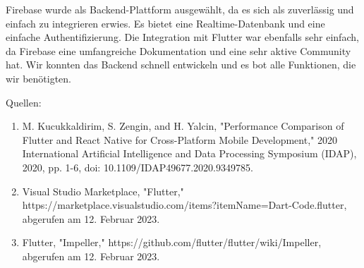 Firebase wurde als Backend-Plattform ausgewählt, da es sich als zuverlässig und einfach zu integrieren erwies. Es bietet eine Realtime-Datenbank und eine einfache Authentifizierung. Die Integration mit Flutter war ebenfalls sehr einfach, da Firebase eine umfangreiche Dokumentation und eine sehr aktive Community hat. Wir konnten das Backend schnell entwickeln und es bot alle Funktionen, die wir benötigten.

Quellen:
\begin{enumerate}
    \item M. Kucukkaldirim, S. Zengin, and H. Yalcin, "Performance Comparison of Flutter and React Native for Cross-Platform Mobile Development," 2020 International Artificial Intelligence and Data Processing Symposium (IDAP), 2020, pp. 1-6, doi: 10.1109/IDAP49677.2020.9349785.
    \item Visual Studio Marketplace, "Flutter," https://marketplace.visualstudio.com/items?itemName=Dart-Code.flutter, abgerufen am 12. Februar 2023.
    \item Flutter, "Impeller," https://github.com/flutter/flutter/wiki/Impeller, abgerufen am 12. Februar 2023.
\end{enumerate}